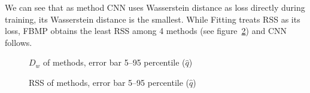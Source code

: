 We can see that as method CNN uses Wasserstein distance as loss directly during training, its Wasserstein distance is the smallest. While Fitting treats RSS as its loss, FBMP obtains the least RSS among 4 methods (see figure~\ref{fig:rsssummary}) and CNN follows. 
\begin{figure}[H]
    \centering
    \resizebox{\textwidth}{!}{}
    \caption{\label{fig:wdistsummary} $D_w$ of methods, error bar 5--95 percentile ($\hat{q}$)}
\end{figure}

\begin{figure}[H]
    \centering
    \resizebox{\textwidth}{!}{}
    \caption{\label{fig:rsssummary} RSS of methods, error bar 5--95 percentile ($\hat{q}$)}
\end{figure}
